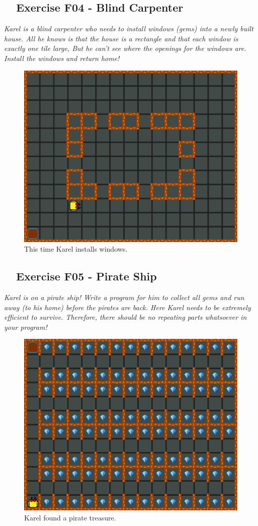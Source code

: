 {{{{\subsection{\ \ Exercise F04 - Blind Carpenter}

{\em Karel is a blind carpenter who needs to install windows (gems) into a newly built house. All he knows is that the house is a rectangle and that each window is exactly one tile large, But he can't see where the openings for the windows are. Install the windows and return home!}


\begin{figure}[!ht]
\begin{center}
\includegraphics[height=0.4\textwidth]{imgk/f04.png}
\end{center}
\vspace{-4mm}
\caption{This time Karel installs windows.}
\label{fig:f04}
\vspace{-10mm}
\end{figure}
\noindent
\newpage


\subsection{\ \ Exercise F05 - Pirate Ship}

{\em Karel is on a pirate ship! Write a program for him to collect all 
gems and run away (to his home) before the pirates are back. Here Karel 
needs to be extremely efficient to survive. Therefore, there should be 
no repeating parts whatsoever in your program!}


\begin{figure}[!ht]
\begin{center}
\includegraphics[height=0.4\textwidth]{imgk/f05.png}
\end{center}
\vspace{-4mm}
\caption{Karel found a pirate treasure.}
\label{fig:f05}
\vspace{-10mm}
\end{figure}
\noindent

}}}}
